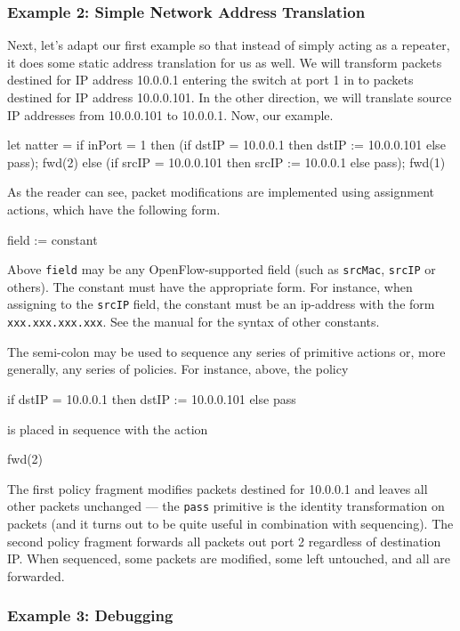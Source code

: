 \documentclass{article}
\newcommand{\code}[1]{\texttt{#1}}
\begin{document}
\subsubsection{Example 2: Simple Network Address Translation}

Next, let's adapt our first example so that instead of simply acting
as a repeater, it does some static address translation for us as well.
We will transform packets destined for IP address 10.0.0.1 entering the 
switch at port 1 in to packets destined for IP address 10.0.0.101.
In the other direction, we will translate source IP addresses from
10.0.0.101 to 10.0.0.1.  Now, our example.
%
\begin{progeg}
let natter =
  if inPort = 1 then
    (if dstIP = 10.0.0.1 then dstIP := 10.0.0.101 else pass); 
    fwd(2)
  else 
    (if srcIP = 10.0.0.101 then srcIP := 10.0.0.1 else pass); 
    fwd(1)
\end{progeg}
%
As the reader can see, packet modifications are implemented using
assignment actions, which have the following form.
%
\begin{progeg}
field := constant
\end{progeg}
%
Above \code{field} may be any OpenFlow-supported field (such as 
\code{srcMac}, \code{srcIP} or others).  The constant must have the
appropriate form.  For instance, when assigning to the \code{srcIP}
field, the constant must be an ip-address with the form 
\code{xxx.xxx.xxx.xxx}.  See the manual for the syntax of other
constants.

The semi-colon may be used to sequence any series of primitive actions
or, more generally, any series of policies.  For instance, above, the policy
%
\begin{progeg}
if dstIP = 10.0.0.1 then dstIP := 10.0.0.101 else pass
\end{progeg}
%
is placed in sequence with the action
%
\begin{progeg}
fwd(2)
\end{progeg}
%
The first policy fragment modifies packets destined for 10.0.0.1 and leaves
all other packets unchanged --- the \code{pass} primitive is the identity
transformation on packets (and it turns out to be quite useful in
combination with sequencing). The second policy fragment 
forwards all packets out port 2 regardless
of destination IP.  When sequenced, some packets are modified, some left
untouched, and all are forwarded.

\subsubsection{Example 3: Debugging}
\end{document}
